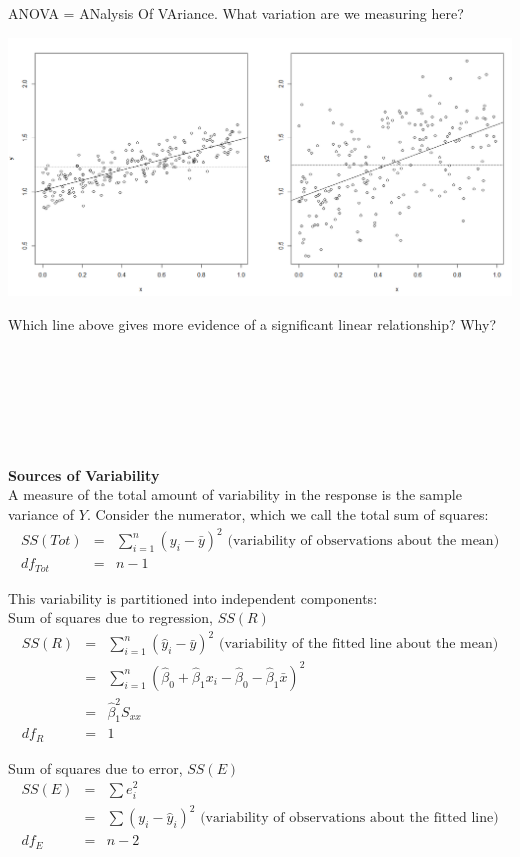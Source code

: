 ANOVA = ANalysis Of VAriance.  What variation are we measuring here?
\begin{flushleft}
\includegraphics[scale=0.4]{slopes}
\end{flushleft}
Which line above gives more evidence of a significant linear relationship?  Why?\\~\\~\\~\\~\\~\\~\\


\newpage

\textbf{Sources of Variability}\\
A measure of the total amount of variability in the response is the sample variance of $Y$.  Consider the numerator, which we call the total sum of squares:
\begin{eqnarray*}
SS(Tot) &= &\sum_{i=1}^n (y_i - \bar{y})^2 \text{   (variability of observations about the mean)}\\
df_{Tot}&=&n-1
\end{eqnarray*}

This variability is partitioned into independent components: \\
Sum of squares due to regression, $SS(R)$
\begin{eqnarray*}
SS(R) & = & \sum_{i=1}^n (\hat{y}_i - \bar{y})^2 \text{     (variability of the fitted line about the mean)}\\
& = & \sum_{i=1}^n (\hat{\beta}_0+\hat{\beta}_1x_i - \hat{\beta}_0-\hat{\beta}_1\bar{x})^2\\
& = & \hat{\beta}_{1}^2S_{xx}\\
df_R & = & 1
\end{eqnarray*}

Sum of squares due to error, $SS(E)$
\begin{eqnarray*}
SS(E) & = & \sum e_i^2 \\
& = & \sum (y_i - \hat{y}_i)^2 \text{    (variability of observations about the fitted line)}\\
df_E & = & n-2
\end{eqnarray*}

